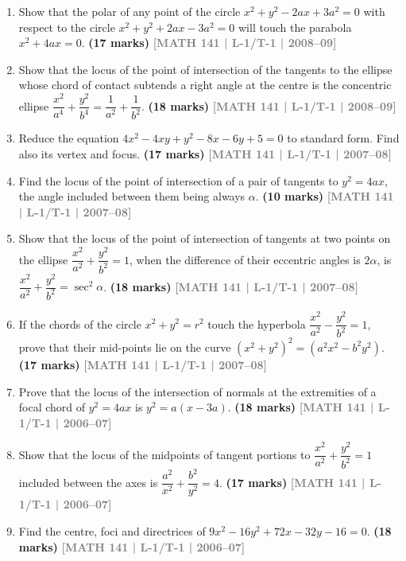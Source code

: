 \documentclass[12pt,a4paper]{article}
\newcommand{\yr}[1]{\hfill\textcolor{gray}{\small\textbf{[#1]}}}
\newcommand{\mk}[1]{\textcolor{orange!70!black}{\small\textbf{(#1 marks)}}}
\begin{document}
\begin{enumerate}
\item Show that the polar of any point of the circle $x^{2}+y^{2}-2ax+3a^{2}=0$ with respect to the circle $x^{2}+y^{2}+2ax-3a^{2}=0$ will touch the parabola $x^{2}+4ax=0$.
\mk{17} \yr{MATH 141 | L-1/T-1 | 2008--09}

\item Show that the locus of the point of intersection of the tangents to the ellipse whose chord of contact subtends a right angle at the centre is the concentric ellipse $\dfrac{x^{2}}{a^{4}}+\dfrac{y^{2}}{b^{4}}=\dfrac{1}{a^{2}}+\dfrac{1}{b^{2}}$.
\mk{18} \yr{MATH 141 | L-1/T-1 | 2008--09}

\item Reduce the equation $4x^{2}-4xy+y^{2}-8x-6y+5=0$ to standard form. Find also its vertex and focus.
\mk{17} \yr{MATH 141 | L-1/T-1 | 2007--08}

\item Find the locus of the point of intersection of a pair of tangents to $y^{2}=4ax$, the angle included between them being always $\alpha$.
\mk{10} \yr{MATH 141 | L-1/T-1 | 2007--08}

\item Show that the locus of the point of intersection of tangents at two points on the ellipse $\dfrac{x^{2}}{a^{2}}+\dfrac{y^{2}}{b^{2}}=1$, when the difference of their eccentric angles is $2\alpha$, is $\dfrac{x^{2}}{a^{2}}+\dfrac{y^{2}}{b^{2}}=\sec^{2}\alpha$.
\mk{18} \yr{MATH 141 | L-1/T-1 | 2007--08}

\item If the chords of the circle $x^{2}+y^{2}=r^{2}$ touch the hyperbola $\dfrac{x^{2}}{a^{2}}-\dfrac{y^{2}}{b^{2}}=1$, prove that their mid-points lie on the curve $(x^{2}+y^{2})^{2}=(a^{2}x^{2}-b^{2}y^{2})$.
\mk{17} \yr{MATH 141 | L-1/T-1 | 2007--08}

\item Prove that the locus of the intersection of normals at the extremities of a focal chord of $y^{2}=4ax$ is $y^{2}=a(x-3a)$.
\mk{18} \yr{MATH 141 | L-1/T-1 | 2006--07}

\item Show that the locus of the midpoints of tangent portions to $\dfrac{x^{2}}{a^{2}}+\dfrac{y^{2}}{b^{2}}=1$ included between the axes is $\dfrac{a^{2}}{x^{2}}+\dfrac{b^{2}}{y^{2}}=4$.
\mk{17} \yr{MATH 141 | L-1/T-1 | 2006--07}


\item Find the centre, foci and directrices of $9x^{2}-16y^{2}+72x-32y-16=0$.
\mk{18} \yr{MATH 141 | L-1/T-1 | 2006--07}


\end{enumerate}
\end{document}
